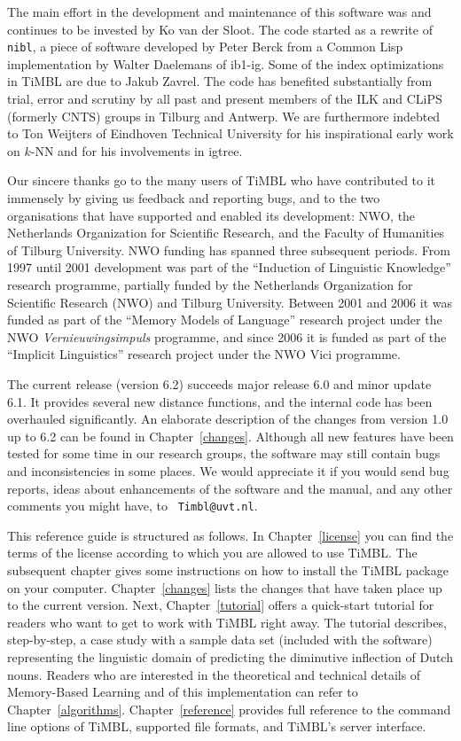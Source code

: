 \documentclass{report}
\begin{document}
The main effort in the development and maintenance of this software
was and continues to be invested by Ko van der Sloot. The code started
as a rewrite of {\tt nibl}, a piece of software developed by Peter
Berck from a Common Lisp implementation by Walter Daelemans of {\sc
  ib1-ig}. Some of the index optimizations in TiMBL are due to Jakub
Zavrel. The code has benefited substantially from trial, error and
scrutiny by all past and present members of the ILK and CLiPS
(formerly CNTS) groups in Tilburg and Antwerp. We are furthermore
indebted to Ton Weijters of Eindhoven Technical University for his
inspirational early work on $k$-NN and for his involvements in {\sc
  igtree}.

Our sincere thanks go to the many users of TiMBL who have contributed
to it immensely by giving us feedback and reporting bugs, and to the
two organisations that have supported and enabled its development:
NWO, the Netherlands Organization for Scientific Research, and the
Faculty of Humanities of Tilburg University. NWO funding has spanned
three subsequent periods. From 1997 until 2001 development was part of
the ``Induction of Linguistic Knowledge'' research programme,
partially funded by the Netherlands Organization for Scientific
Research (NWO) and Tilburg University. Between 2001 and 2006 it was
funded as part of the ``Memory Models of Language'' research project
under the NWO {\em Vernieuwingsimpuls}\/ programme, and since 2006 it
is funded as part of the ``Implicit Linguistics'' research project
under the NWO Vici programme.

The current release (version 6.2) succeeds major release 6.0 and minor
update 6.1. It provides several new distance functions, and the
internal code has been overhauled significantly. An elaborate
description of the changes from version 1.0 up to 6.2 can be found in
Chapter~\ref{changes}. Although all new features have been tested for
some time in our research groups, the software may still contain bugs
and inconsistencies in some places. We would appreciate it if you
would send bug reports, ideas about enhancements of the software and
the manual, and any other comments you might have, to {\tt
  Timbl@uvt.nl}.

This reference guide is structured as follows. In
Chapter~\ref{license} you can find the terms of the license according
to which you are allowed to use TiMBL. The subsequent chapter gives
some instructions on how to install the TiMBL package on your
computer. Chapter~\ref{changes} lists the changes that have taken
place up to the current version. Next, Chapter~\ref{tutorial} offers a
quick-start tutorial for readers who want to get to work with TiMBL
right away. The tutorial describes, step-by-step, a case study with a
sample data set (included with the software) representing the
linguistic domain of predicting the diminutive inflection of Dutch
nouns.  Readers who are interested in the theoretical and technical
details of Memory-Based Learning and of this implementation can refer
to Chapter~\ref{algorithms}. Chapter~\ref{reference} provides full
reference to the command line options of TiMBL, supported file
formats, and TiMBL's server interface.
\end{document}
